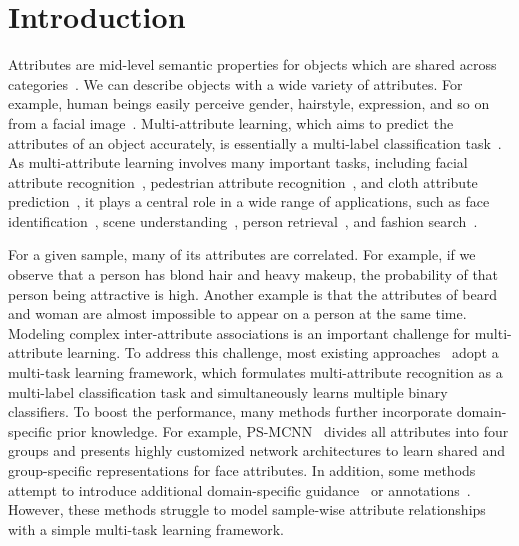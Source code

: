 \documentclass[runningheads]{llncs}
\begin{document}
\section{Introduction}
\label{sec:intro}
Attributes are mid-level semantic properties for objects which are shared across categories~\cite{farhadi2009describing,duan2012discovering,li2021learning,feris2017visual}. We can describe objects with a wide variety of attributes. For example, human beings easily perceive gender, hairstyle, expression, and so on from a facial image~\cite{li2019bridgenet,li2020social}.  Multi-attribute learning, which aims to predict the attributes of an object accurately, is essentially a multi-label classification task~\cite{shin2020semi}. As multi-attribute learning involves many important tasks, including facial attribute recognition~\cite{liu2015deep,kalayeh2017improving,cao2018partially}, pedestrian attribute recognition~\cite{jia2021spatial,tang2019improving,guo2019visual}, and cloth attribute prediction~\cite{liu2016deepfashion,zhang2020texture}, it plays a central role in a wide range of applications, such as face identification~\cite{cao2018partially}, scene understanding~\cite{shao2015deeply}, person retrieval~\cite{li2018richly}, and fashion search~\cite{ak2018learning}.


For a given sample, many of its attributes are correlated. For example, if we observe that a person has blond hair and heavy makeup, the probability of that person being attractive is high. Another example is that the attributes of beard and woman are almost impossible to appear on a person at the same time. Modeling complex inter-attribute associations is an important challenge for multi-attribute learning. To address this challenge, most existing approaches~\cite{rudd2016moon,cao2018partially,jia2021spatial,tang2019improving} adopt a multi-task learning framework, which formulates multi-attribute recognition as a multi-label classification task and simultaneously learns multiple binary classifiers. To boost the performance, many methods further incorporate domain-specific prior knowledge.  For example, PS-MCNN~\cite{cao2018partially} divides all attributes into four groups and presents highly customized network architectures to learn shared and group-specific representations for face attributes. In addition, some methods attempt to introduce additional domain-specific guidance~\cite{kalayeh2017improving} or annotations~\cite{liu2016deepfashion}. However, these methods struggle to model sample-wise attribute relationships with a simple multi-task learning framework. 
\end{document}
